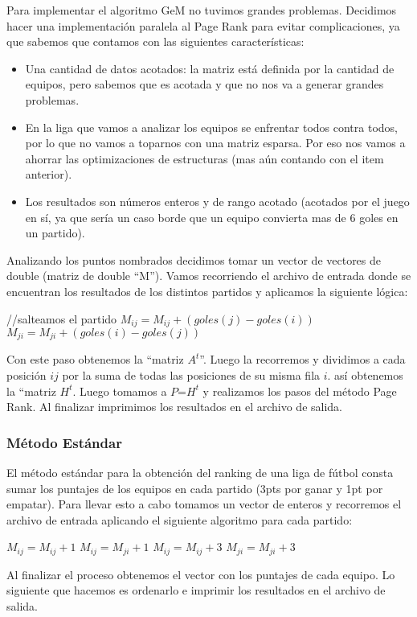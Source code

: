 \par Para implementar el algoritmo GeM no tuvimos grandes problemas. Decidimos hacer una implementaci\'on paralela al Page Rank para evitar complicaciones, ya que sabemos que contamos con las siguientes caracter\'isticas:
\begin{itemize}
	\item Una cantidad de datos acotados: la matriz est\'a definida por la cantidad de equipos, pero sabemos que es acotada y que no nos va a generar grandes problemas.
	\item En la liga que vamos a analizar los equipos se enfrentar todos contra todos, por lo que no vamos a toparnos con una matriz esparsa. Por eso nos vamos a ahorrar las optimizaciones de estructuras (mas a\'un contando con el item anterior).
	\item Los resultados son n\'umeros enteros y de rango acotado (acotados por el juego en s\'i, ya que ser\'ia un caso borde que un equipo convierta mas de 6 goles en un partido).
\end{itemize}
\par Analizando los puntos nombrados decidimos tomar un vector de vectores de double (matriz de double ``M''). Vamos recorriendo el archivo de entrada donde se encuentran los resultados de los distintos partidos y aplicamos la siguiente l\'ogica:

\begin{algorithmic}[1]
	\State //salteamos el partido
	\State $M_{ij} = M_{ij} + ( goles(j) - goles(i) )$
\Else
	\State $M_{ji} = M_{ji} + ( goles(i) - goles(j) )$
\EndIf
\end{algorithmic}

Con este paso obtenemos la ``matriz $A^t$''. Luego la recorremos y dividimos a cada posici\'on $ij$ por la suma de todas las posiciones de su misma fila $i$. as\'i obtenemos la ``matriz $H^t$. Luego tomamos a $P$=$H^t$ y realizamos los pasos del m\'etodo Page Rank. Al finalizar imprimimos los resultados en el archivo de salida.

\subsubsection{M\'etodo Est\'andar}

	\par El m\'etodo est\'andar para la obtenci\'on del ranking de una liga de f\'utbol consta sumar los puntajes de los equipos en cada partido (3pts por ganar y 1pt por empatar). Para llevar esto a cabo tomamos un vector de enteros y recorremos el archivo de entrada aplicando el siguiente algoritmo para cada partido:

\begin{algorithmic}[1]
	\State $M_{ij} = M_{ij} + 1$
	\State $M_{ij} = M_{ji} + 1$
	\State $M_{ij} = M_{ij} + 3$
\Else
	\State $M_{ji} = M_{ji} + 3$
\EndIf
\end{algorithmic}

\par Al finalizar el proceso obtenemos el vector con los puntajes de cada equipo. Lo siguiente que hacemos es ordenarlo e imprimir los resultados en el archivo de salida.
